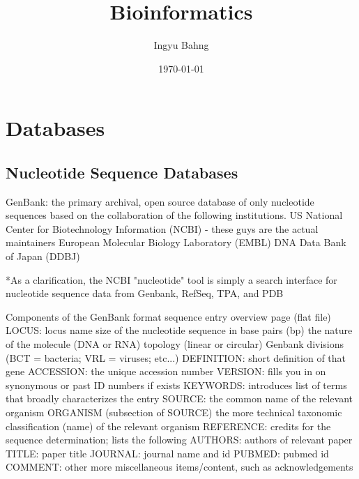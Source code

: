 \documentclass[10pt]{article}
\title{Bioinformatics}
\date{\today}
\author{Ingyu Bahng}
\begin{document}


\section{Databases}

  \subsection{Nucleotide Sequence Databases}

    GenBank: the primary archival, open source database of only nucleotide sequences based on the collaboration of the following institutions. 
      US National Center for Biotechnology Information (NCBI) - these guys are the actual maintainers
      European Molecular Biology Laboratory (EMBL)
      DNA Data Bank of Japan (DDBJ)

    *As a clarification, the NCBI "nucleotide" tool is simply a search interface for nucleotide sequence data from Genbank, RefSeq, TPA, and PDB

    Components of the GenBank format sequence entry overview page (flat file)
      LOCUS:
        locus name
        size of the nucleotide sequence in base pairs (bp)
        the nature of the molecule (DNA or RNA)
        topology (linear or circular)
        Genbank divisions (BCT = bacteria; VRL = viruses; etc...)
      DEFINITION: 
        short definition of that gene
      ACCESSION:
        the unique accession number
      VERSION: 
        fills you in on synonymous or past ID numbers if exists
      KEYWORDS: 
        introduces list of terms that broadly characterizes the entry 
      SOURCE: 
        the common name of the relevant organism
        ORGANISM (subsection of SOURCE)
          the more technical taxonomic classification (name) of the relevant organism
      REFERENCE: 
        credits for the sequence determination; lists the following
          AUTHORS: authors of relevant paper
          TITLE: paper title
          JOURNAL: journal name and id
          PUBMED: pubmed id
      COMMENT: 
        other more miscellaneous items/content, such as acknowledgements
\end{document}
